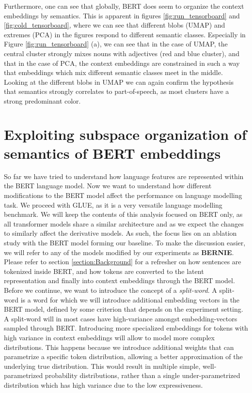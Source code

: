 \documentclass[a4paper,12pt,twoside,openright]{report}
\begin{document}
Furthermore, one can see that globally, BERT does seem to organize the context embeddings by semantics. 
This is apparent in figures \ref{fig:run_tensorboard} and \ref{fig:cold_tensorboard}, where we can see that different blobs (UMAP) and extremes (PCA) in the figures respond to different semantic classes.
Especially in Figure \ref{fig:run_tensorboard} (a), we can see that in the case of UMAP, the central cluster strongly mixes nouns with adjectives (red and blue cluster), and that in the case of PCA, the context embeddings are constrained in such a way that embeddings which mix different semantic classes meet in the middle.
Looking at the different blobs in UMAP we can again confirm the hypothesis that semantics strongly correlates to part-of-speech, as most clusters have a strong predominant color.

\chapter{Exploiting subspace organization of semantics of BERT embeddings}\label{section:ExploitingBERT}


So far we have tried to understand how language features are represented within the BERT language model.
Now we want to understand how different modifications to the BERT model affect the performance on language modelling task.
We proceed with GLUE, as it is a very versatile language modelling benchmark.
We will keep the contents of this analysis focused on BERT only, as all transformer models share a similar architecture and as we expect the changes to similarly affect the derivative models.
As such, the focus lies on an ablation study with the BERT model  forming our baseline.
To make the discussion easier, we will refer to any of the models modified by our experiments as \textbf{BERNIE}. 
Please refer to section \ref{section:Background} for a refresher on how sentences are tokenized inside BERT, and how tokens are converted to the latent representation and finally into context embeddings through the BERT model.
\\

Before we continue, we want to introduce the concept of a \textit{split-word}. A split-word is a word for which we will introduce additional embedding vectors in the BERT model, defined by some criterion that depends on the experiment setting.
A split-word will in most cases have high-variance amongst embedding-vectors sampled through BERT.
Introducing more specialized embeddings for tokens with high variance in context embeddings will allow to model more complex distributions.
This happens because we introduce additional weights that can parametrize a specific token distribution, allowing a better approximation of the underlying true distribution.
This would result in multiple simple, well-parametrized probability distributions, rather than a single under-parametrized distribution which has high variance due to the low expressiveness.
\end{document}
